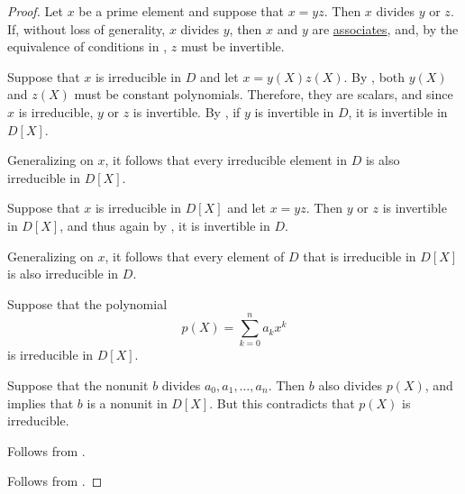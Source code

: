 \begin{proof}
   Let \( x \) be a prime element and suppose that \( x = yz \). Then \( x \) divides \( y \) or \( z \). If, without loss of generality, \( x \) divides \( y \), then \( x \) and \( y \) are \hyperref[def:domain_divisibility/associates]{associates}, and, by the equivalence of conditions in , \( z \) must be invertible.


  \SufficiencySubProof* Suppose that \( x \) is irreducible in \( D \) and let \( x = y(X) z(X) \). By , both \( y(X) \) and \( z(X) \) must be constant polynomials. Therefore, they are scalars, and since \( x \) is irreducible, \( y \) or \( z \) is invertible. By , if \( y \) is invertible in \( D \), it is invertible in \( D[X] \).

  Generalizing on \( x \), it follows that every irreducible element in \( D \) is also irreducible in \( D[X] \).

  \NecessitySubProof* Suppose that \( x \) is irreducible in \( D[X] \) and let \( x = yz \). Then \( y \) or \( z \) is invertible in \( D[X] \), and thus again by , it is invertible in \( D \).

  Generalizing on \( x \), it follows that every element of \( D \) that is irreducible in \( D[X] \) is also irreducible in \( D \).

   Suppose that the polynomial
  \begin{equation*}
    p(X) = \sum_{k=0}^n a_k x^k
  \end{equation*}
  is irreducible in \( D[X] \).

  Suppose that the nonunit \( b \) divides \( a_0, a_1, \ldots, a_n \). Then \( b \) also divides \( p(X) \), and  implies that \( b \) is a nonunit in \( D[X] \). But this contradicts that \( p(X) \) is irreducible.

   Follows from .

   Follows from .
\end{proof}

